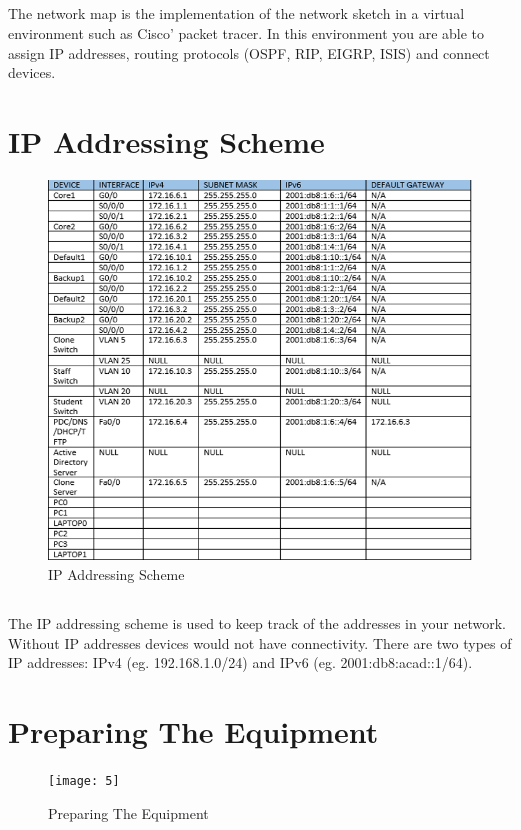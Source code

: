 \documentclass{article}
\begin{document}
\subsection{}
	The network map is the implementation of the network sketch in a virtual environment such as Cisco' packet tracer. In this environment you are able to assign IP addresses, routing protocols (OSPF, RIP, EIGRP, ISIS) and connect devices.
	\newpage
\section{IP Addressing Scheme}
\begin{figure}[h]
		\includegraphics[width=1\linewidth]{4}
		\caption{IP Addressing Scheme}
\end{figure}
\subsection{}
	The IP addressing scheme is used to keep track of the addresses in your network. Without IP addresses devices would not have connectivity. There are two types of IP addresses: IPv4 (eg. 192.168.1.0/24) and IPv6 (eg. 2001:db8:acad::1/64).
	\newpage
\section{Preparing The Equipment}
\begin{figure}[h]
		\texttt{[image: 5]}
		\caption{Preparing The Equipment}
\end{figure}
\end{document}
